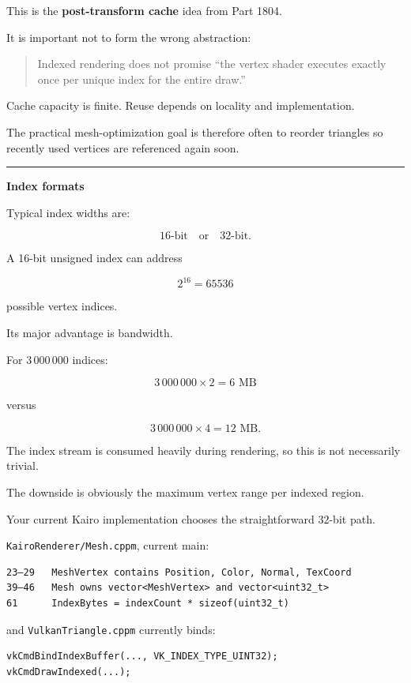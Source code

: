 This is the \textbf{post-transform cache} idea from Part 1804.

It is important not to form the wrong abstraction:

\begin{quote}
Indexed rendering does not promise ``the vertex shader executes exactly once per unique index for the entire draw.''
\end{quote}

Cache capacity is finite. Reuse depends on locality and implementation.

The practical mesh-optimization goal is therefore often to reorder triangles so recently used vertices are referenced again soon.

\begin{center}\rule{0.5\linewidth}{0.5pt}\end{center}

\textbf{Index formats}

Typical index widths are:

\[
16\text{-bit} \quad \text{or} \quad 32\text{-bit}.
\]

A 16-bit unsigned index can address

\[
2^{16}=65536
\]

possible vertex indices.

Its major advantage is bandwidth.

For \(3\,000\,000\) indices:

\[
3\,000\,000\times2 = 6\text{ MB}
\]

versus

\[
3\,000\,000\times4 = 12\text{ MB}.
\]

The index stream is consumed heavily during rendering, so this is not necessarily trivial.

The downside is obviously the maximum vertex range per indexed region.

Your current Kairo implementation chooses the straightforward 32-bit path.

\texttt{KairoRenderer/Mesh.cppm}, current main:

\begin{verbatim}
23–29   MeshVertex contains Position, Color, Normal, TexCoord
39–46   Mesh owns vector<MeshVertex> and vector<uint32_t>
61      IndexBytes = indexCount * sizeof(uint32_t)
\end{verbatim}

and \texttt{VulkanTriangle.cppm} currently binds:

\begin{verbatim}
vkCmdBindIndexBuffer(..., VK_INDEX_TYPE_UINT32);
vkCmdDrawIndexed(...);
\end{verbatim}

